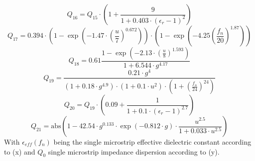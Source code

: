 \documentclass[10pt]{report}
\begin{document}
\begin{equation}
Q_{16} = Q_{15}\cdot \left( 1 + \frac{9}{1+0.403\cdot (\epsilon_r-1)^2} \right)
\end{equation}
\begin{equation}
Q_{17} = 0.394\cdot \left( 1-\exp\left( -1.47\cdot\left( \frac{u}{7} \right) ^{0.672} \right) \right)
        \cdot \left( 1-\exp\left( -4.25\left( \frac{f_n}{20} \right) ^{1.87} \right) \right)
\end{equation}
\begin{equation}
Q_{18} = 0.61\frac{1-\exp\left( -2.13\cdot\left( \frac{u}{8} \right) ^{1.593} \right)}
                  {1+6.544\cdot g^{4.17}}
\end{equation}
\begin{equation}
Q_{19} = \frac{ 0.21\cdot g^4 }{(1+0.18\cdot g^{4.9})\cdot (1+0.1\cdot u^2) \cdot
                \left( 1+\left( \frac{f_n}{24} \right) ^{24} \right)}
\end{equation}
\begin{equation}
Q_{20} = Q_{19}\cdot \left( 0.09 + \frac{1}{1+0.1\cdot (\epsilon_r-1)^{2.7}} \right)
\end{equation}
\begin{equation}
Q_{21} = \text{abs}\left( 1-42.54\cdot g^{0.133}\cdot \exp(-0.812\cdot g)
                   \cdot\frac{u^{2.5}}{1+0.033\cdot u^{2.5}} \right)
\end{equation}
With $\epsilon_{eff}(f_n)$ being the single microstrip effective
dielectric constant according to (x) and $Q_0$ single microstrip
impedance dispersion according to (y).

\addvspace{12pt}
\end{document}
